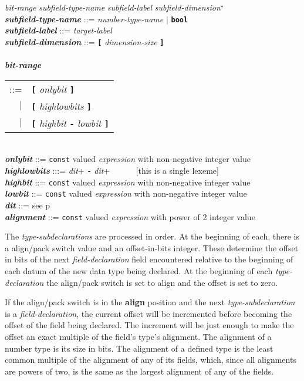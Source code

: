 \documentclass[12pt]{article}
\newcommand{\TT}[1]{{\tt \bfseries #1}}
\newcommand{\STAR}{{\Large $^\star$}}
\newcommand{\key}[1]{{\rm \bfseries #1}}
\newcommand{\emkey}[1]{{\em \bfseries #1}}
\newcommand{\pagref}[1]{p\pageref{#1}}
\newenvironment{indpar}[1][0.3in]%
	{\begin{list}{}%
		     {\setlength{\itemsep}{0in}%
		      \setlength{\topsep}{0in}%
		      \setlength{\parsep}{1ex}%
		      \setlength{\labelwidth}{#1}%
		      \setlength{\leftmargin}{#1}%
		      \addtolength{\leftmargin}{\labelsep}}%
	 \item}%
	{\end{list}}
\begin{document}
\begin{indpar}
    {\em bit-range} {\em subfield-type-name} {\em subfield-label}
    		{\em subfield-dimension}\STAR{} \\
\emkey{subfield-type-name}\label{SUBFIELD-TYPE-NAME} ::=
    {\em number-type-name} $|$ \TT{bool} \\
\emkey{subfield-label}\label{SUBFIELD-LABEL} ::=  {\em target-label} \\
\emkey{subfield-dimension} ::=  \TT{[} {\em dimension-size} \TT{]} \\
\\[2ex]
\emkey{bit-range}
    \begin{tabular}[t]{@{}rl}
    ::= &  \TT{[} {\em onlybit} \TT{]} \\
    $|$ &  \TT{[} {\em highlowbits} \TT{]} \\
    $|$ &  \TT{[} {\em highbit} \TT{-} {\em lowbit} \TT{]}
    \end{tabular} \\
\emkey{onlybit} ::= {\tt const} valued {\em expression}
		    with non-negative integer value \\
\emkey{highlowbits} :::= {\em dit}+ \TT{-} {\em dit}+
           ~~~~~ [this is a single lexeme] \\
\emkey{highbit} ::= {\tt const} valued {\em expression}
		    with non-negative integer value \\
\emkey{lowbit} ::= {\tt const} valued {\em expression}
		   with non-negative integer value \\
\emkey{dit} ::= see \pagref{DIT}
\\[2ex]
\emkey{alignment} ::= {\tt const} valued {\em expression}
		      with power of 2 integer value
\end{indpar}

The {\em type-subdeclarations} are processed in order.  At the
beginning of each, there is a align/pack switch value and an
offset-in-bits integer.  These determine the offset in bits
of the next {\em field-declaration} field encountered
relative to the beginning of each datum of the new data
type being declared.  At the beginning of each {\em type-declaration}
the align/pack switch is set to align and the offset is set to zero.

If the align/pack switch is in the \key{align} position and the
next {\em type-subdeclaration} is a {\em field-declaration}, the
current offset will be incremented before becoming the offset
of the field being declared.  The increment will be just enough
to make the offset an exact multiple of the field's type's alignment.
The alignment of a number type is its size in bits.  The alignment
of a defined type is the least common multiple of the alignment of
any of its fields, which, since all alignments are powers of two,
is the same as the largest alignment of any of the fields.
\end{document}
